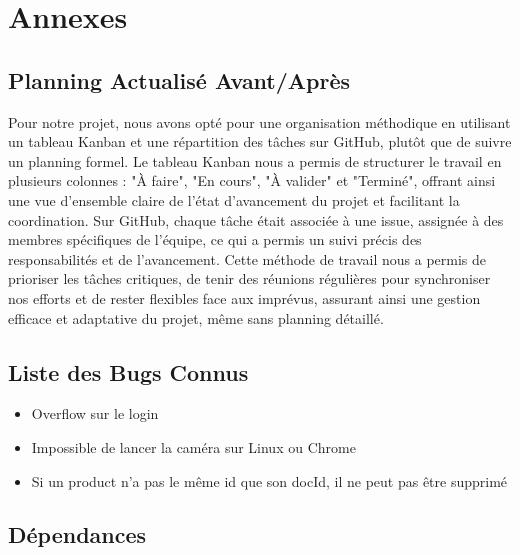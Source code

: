 \section{Annexes}

\subsection{Planning Actualisé Avant/Après}

Pour notre projet, nous avons opté pour une organisation méthodique en utilisant un tableau Kanban et une répartition des tâches sur GitHub, plutôt que de suivre un planning formel. Le tableau Kanban nous a permis de structurer le travail en plusieurs colonnes : "À faire", "En cours", "À valider" et "Terminé", offrant ainsi une vue d'ensemble claire de l'état d'avancement du projet et facilitant la coordination. Sur GitHub, chaque tâche était associée à une issue, assignée à des membres spécifiques de l'équipe, ce qui a permis un suivi précis des responsabilités et de l'avancement. Cette méthode de travail nous a permis de prioriser les tâches critiques, de tenir des réunions régulières pour synchroniser nos efforts et de rester flexibles face aux imprévus, assurant ainsi une gestion efficace et adaptative du projet, même sans planning détaillé.

\subsection{Liste des Bugs Connus}

\begin{itemize}[noitemsep]
    \item Overflow sur le login
    \item Impossible de lancer la caméra sur Linux ou Chrome
    \item Si un product n'a pas le même id que son docId, il ne peut pas être supprimé
\end{itemize}

\subsection{Dépendances}

